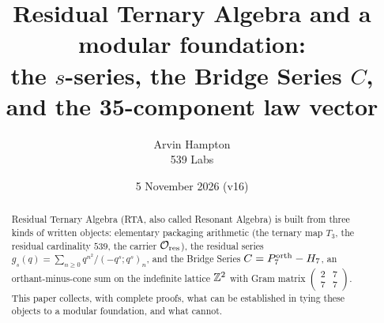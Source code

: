 \title{Residual Ternary Algebra and a modular foundation:\\ the $s$-series, the Bridge Series $C$, and the 35-component law vector}
\author{Arvin Hampton\\ \small 539 Labs}
\date{5 November 2026 (v16)}

\maketitle
\begin{abstract}
Residual Ternary Algebra (RTA, also called Resonant Algebra) is built from three kinds of written objects: elementary packaging arithmetic
(the ternary map $T_3$, the residual cardinality $539$, the carrier $\mathcal O_{\rm res}$), the residual series
$g_s(q)=\sum_{n\ge0}q^{n^2}/(-q^s;q^s)_n$, and the Bridge Series $C=P^{\mathrm{orth}}_7-H_7$, an orthant-minus-cone sum on the indefinite lattice
$\mathbb{Z}^2$ with Gram matrix $\left(\begin{smallmatrix}2&7\\7&7\end{smallmatrix}\right)$. This paper collects, with complete proofs, what can be
established in tying these objects to a modular foundation, and what cannot.


\end{abstract}
